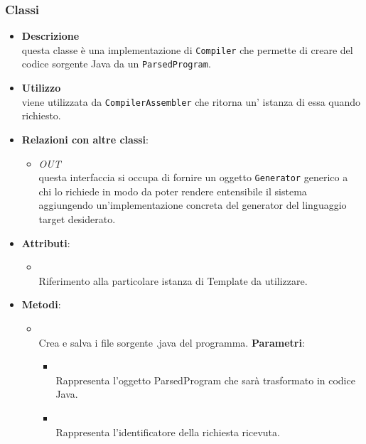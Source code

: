 \subsubsection{Classi}
\label{\nogloxy{swedesigner::server::generator::java::JavaGenerator}}
\begin{figure}[h]
\centering
{}
\caption{}
\end{figure}
\FloatBarrier
\begin{itemize}
\item \textbf{Descrizione}\\
questa classe è una implementazione di \texttt{Compiler} che permette di creare del codice sorgente Java da un \texttt{ParsedProgram}.
\item \textbf{Utilizzo}\\
viene utilizzata da \texttt{CompilerAssembler} che ritorna un' istanza di essa quando richiesto.
\item \textbf{Relazioni con altre classi}:
\begin{itemize}
\item \textit{OUT} \hyperref[\nogloxy{swedesigner::server::generator::Generator}]{}\\
questa interfaccia si occupa di fornire un oggetto \texttt{Generator} generico a chi lo richiede in modo da poter rendere entensibile il sistema aggiungendo un'implementazione concreta del generator del linguaggio target desiderato.
\end{itemize}
\item \textbf{Attributi}:
\begin{itemize}
\item {}
\\ Riferimento alla particolare istanza di Template da utilizzare.
\end{itemize}
\item \textbf{Metodi}:
\begin{itemize}
\item {}
\\ Crea e salva i file sorgente .java del programma.
\textbf{Parametri}:
\begin{itemize}
\item {}
\\ Rappresenta l'oggetto ParsedProgram che sarà trasformato in codice Java. 
\item {}
\\ Rappresenta l'identificatore della richiesta ricevuta.
\end{itemize}
\end{itemize}
\end{itemize}
